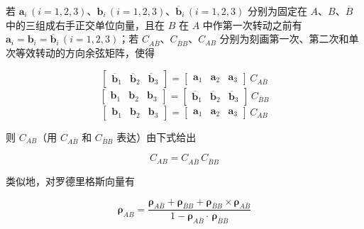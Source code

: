 若 $\mathbf{a}_i\,(i=1,2,3)$、$\mathbf{b}_i\,(i=1,2,3)$、$\overline{\mathbf{b}}_i\,(i=1,2,3)$ 分别为固定在 $A$、$B$、$\overline{B}$ 中的三组成右手正交单位向量，且在 $B$ 在 $A$ 中作第一次转动之前有 $\mathbf{a}_i=\mathbf{b}_i=\overline{\mathbf{b}}_i\,(i=1,2,3)$；若 $C_{A\bar B}$、$C_{\bar B B}$、$C_{AB}$ 分别为刻画第一次、第二次和单次等效转动的方向余弦矩阵，使得

\begin{equation}\label{eq:连续转动:C_Abar_B}
\begin{bmatrix}\overline{\mathbf{b}}_1 & \overline{\mathbf{b}}_2 & \overline{\mathbf{b}}_3\end{bmatrix}
=\begin{bmatrix}\mathbf{a}_1 & \mathbf{a}_2 & \mathbf{a}_3\end{bmatrix}\,C_{A\bar B}
\end{equation}
\begin{equation}\label{eq:连续转动:C_Bar_B_B}
\begin{bmatrix}\mathbf{b}_1 & \mathbf{b}_2 & \mathbf{b}_3\end{bmatrix}
=\begin{bmatrix}\overline{\mathbf{b}}_1 & \overline{\mathbf{b}}_2 & \overline{\mathbf{b}}_3\end{bmatrix}\,C_{\bar B B}
\end{equation}
\begin{equation}\label{eq:连续转动:C_AB}
\begin{bmatrix}\mathbf{b}_1 & \mathbf{b}_2 & \mathbf{b}_3\end{bmatrix}
=\begin{bmatrix}\mathbf{a}_1 & \mathbf{a}_2 & \mathbf{a}_3\end{bmatrix}\,C_{AB}
\end{equation}

则 $C_{AB}$（用 $C_{A\bar B}$ 和 $C_{\bar B B}$ 表达）由下式给出

\begin{equation}\label{eq:连续转动:方向余弦乘积}
C_{AB}=C_{A\bar B}\,C_{\bar B B}
\end{equation}

类似地，对罗德里格斯向量有

\begin{equation}\label{eq:连续转动:罗德里格斯乘积}
\boldsymbol{\rho}_{AB}=\frac{\boldsymbol{\rho}_{A\bar B}+\boldsymbol{\rho}_{\bar B B}+\boldsymbol{\rho}_{\bar B B}\times\boldsymbol{\rho}_{A\bar B}}{1-\boldsymbol{\rho}_{A\bar B}\cdot\,\boldsymbol{\rho}_{\bar B B}}
\end{equation}

